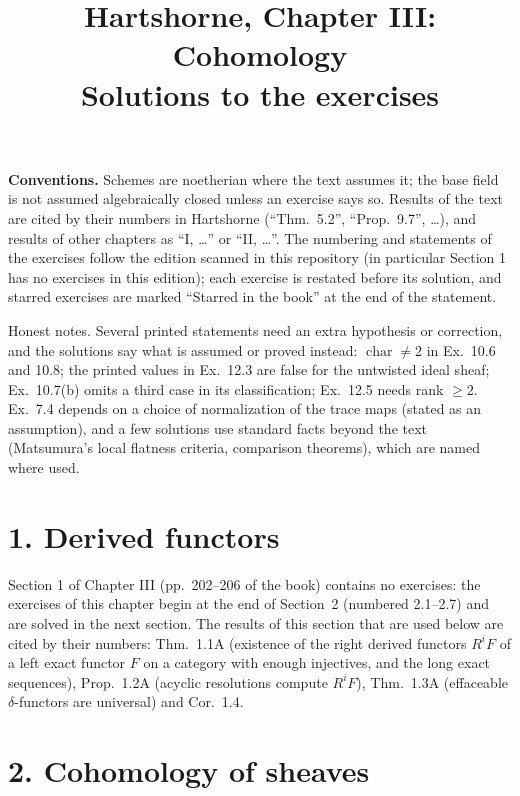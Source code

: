 \documentclass[11pt]{article}
\title{Hartshorne, Chapter III: Cohomology\\[2pt]\large Solutions to the exercises}
\author{}
\date{}
\begin{document}
\maketitle
\noindent\textbf{Conventions.} Schemes are noetherian where the text assumes it; the base field is not assumed algebraically closed unless an exercise says so. Results of the text are cited by their numbers in Hartshorne (``Thm.~5.2'', ``Prop.~9.7'', \dots), and results of other chapters as ``I, \dots'' or ``II, \dots''. The numbering and statements of the exercises follow the edition scanned in this repository (in particular Section 1 has no exercises in this edition); each exercise is restated before its solution, and starred exercises are marked ``Starred in the book'' at the end of the statement.

Honest notes. Several printed statements need an extra hypothesis or correction, and the solutions say what is assumed or proved instead: $\operatorname{char}\neq2$ in Ex.~10.6 and 10.8; the printed values in Ex.~12.3 are false for the untwisted ideal sheaf; Ex.~10.7(b) omits a third case in its classification; Ex.~12.5 needs rank $\ge2$. Ex.~7.4 depends on a choice of normalization of the trace maps (stated as an assumption), and a few solutions use standard facts beyond the text (Matsumura's local flatness criteria, comparison theorems), which are named where used.

\section*{1. Derived functors}

Section 1 of Chapter III (pp.~202--206 of the book) contains no exercises: the exercises of this chapter begin at the end of Section~2 (numbered 2.1--2.7) and are solved in the next section. The results of this section that are used below are cited by their numbers: Thm.~1.1A (existence of the right derived functors $R^iF$ of a left exact functor $F$ on a category with enough injectives, and the long exact sequences), Prop.~1.2A (acyclic resolutions compute $R^iF$), Thm.~1.3A (effaceable $\delta$-functors are universal) and Cor.~1.4.

\section*{2. Cohomology of sheaves}
\end{document}
